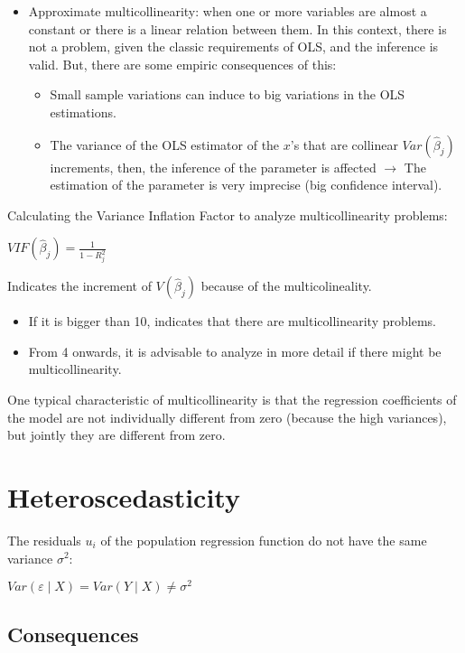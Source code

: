 \documentclass[10pt,landscape]{article}
\begin{document}
\begin{multicols}{3}
\begin{itemize}[leftmargin=*]
\item Approximate multicollinearity: when one or more variables are almost a constant or there is a linear relation between them. In this context, there is not a problem, given the classic requirements of OLS, and the inference is valid. But, there are some empiric consequences of this:
\begin{itemize}[leftmargin=*]
\item Small sample variations can induce to big variations in the OLS estimations.
\item The variance of the OLS estimator of the $x$'s that are collinear $Var(\hat{\beta}_j)$ increments, then, the inference of the parameter is affected $\rightarrow$ The estimation of the parameter is very imprecise (big confidence interval).
\end{itemize}
\end{itemize}

Calculating the Variance Inflation Factor to analyze multicollinearity problems:

$VIF(\hat{\beta}_j) = \frac{1}{1-R_j^2}$

Indicates the increment of $V(\hat{\beta}_j)$ because of the multicolineality.

\begin{itemize}[leftmargin=*]
\item If it is bigger than 10, indicates that there are multicollinearity problems.
\item From 4 onwards, it is advisable to analyze in more detail if there might be
multicollinearity.
\end{itemize}

One typical characteristic of multicollinearity is that the regression coefficients of the model are not individually different from zero (because the high variances), but jointly they are different from zero.

\columnbreak

\section*{Heteroscedasticity}

The residuals $u_i$ of the population regression function do not have the same variance $\sigma^2$:

$Var(\varepsilon \mid X) = Var(Y \mid X) \neq \sigma^2$

\subsection*{Consequences}


\end{multicols}
\end{document}
